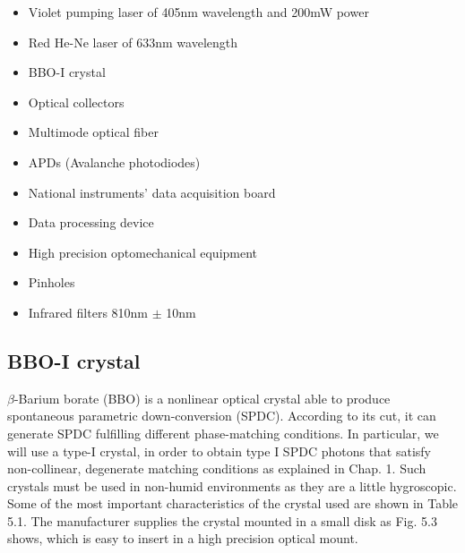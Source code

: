 \documentclass[12pt]{book}
\begin{document}
\begin{itemize}



\item Violet pumping laser of 405nm wavelength and 200mW power
\item Red He-Ne laser of 633nm wavelength
\item BBO-I crystal
\item Optical collectors
\item Multimode optical fiber
\item APDs (Avalanche photodiodes)
\item National instruments' data acquisition board
\item Data processing device
\item High precision optomechanical equipment
\item Pinholes
\item Infrared filters 810nm $\pm$ 10nm
\end{itemize}

\subsection{BBO-I crystal}
$\beta$-Barium borate (BBO) is a nonlinear optical crystal able to produce spontaneous parametric down-conversion (SPDC). According to its cut, it can generate SPDC fulfilling different phase-matching conditions. In particular, we will use a type-I crystal, in order to obtain type I SPDC photons that satisfy non-collinear, degenerate matching conditions as explained in Chap. 1. Such crystals must be used in non-humid environments as they are a little hygroscopic. Some of the most important characteristics of the crystal used are shown in Table 5.1. The manufacturer supplies the crystal mounted in a small disk as Fig. 5.3 shows, which is easy to insert in a high precision optical mount.
 
\end{document}
